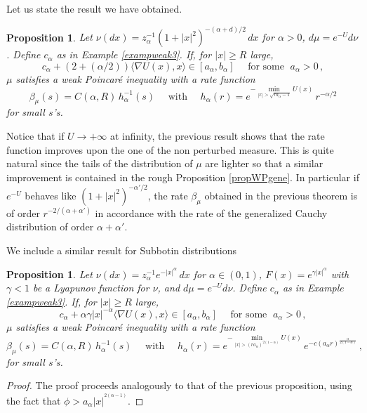\documentclass[11pt,reqno]{amsart}
\numberwithin{equation}{section}
\newtheorem{proposition}[theorem]{Proposition}
\theoremstyle{definition}
\theoremstyle{remark}
\begin{document}
Let us state the result we have obtained.
\begin{proposition}\label{propperturbcauchy}
Let $\nu(dx)= z_\alpha^{-1} (1+|x|^2)^{- (\alpha+d)/2} \, dx$ for $\alpha>0$, $d\mu=e^{-U}d\nu$. Define $c_\alpha$ as in Example \ref{exampweak3}. If, for $|x| \geq R$ large, $$c_\alpha + (2+(\alpha/2)) \langle \nabla U(x), x\rangle \in [a_\alpha,b_\alpha] \quad \textrm{ for some } \; a_\alpha >0 \, ,$$ $\mu$ satisfies a weak Poincar\'e inequality with a rate function 
$$\beta_\mu(s) = C(\alpha,R) \, h_\alpha^{-1}(s) \quad \textrm{ with } \quad {h_\alpha(r)= e^{- \min_{|x|>\sqrt{ra_\alpha-1}} U(x)} \, r^{-\alpha/2} }$$ 
for small $s$'s.
\end{proposition}
Notice that if $U \to + \infty$ at infinity, the previous result shows that the rate function improves upon the one of the non perturbed measure. This is quite natural since the tails of the distribution of $\mu$ are lighter so that a similar improvement is contained in the rough Proposition \ref{propWPgene}. In particular if $e^{-U}$ behaves like $(1+|x|^2)^{-\alpha'/2}$, the rate $\beta_\mu$ obtained in the previous theorem is of order $r^{- 2/(\alpha+\alpha')}$ in accordance with the rate of the generalized Cauchy distribution of order $\alpha+\alpha'$.


We include a similar result for Subbotin distributions
\begin{proposition}\label{propperturbsubbotin}
Let $\nu(dx)= z_\alpha^{-1} e^{-\vert x\vert^\alpha} \, dx$ for $\alpha\in(0,1)$, $F(x)=e^{\gamma |x|^\alpha}$ with  $\gamma <1$ be a Lyapunov function for $\nu$, and $d\mu=e^{-U}d\nu$. Define $c_\alpha$ as in Example \ref{exampweak3}. If, for $|x| \geq R$ large, $$c_\alpha + \alpha \gamma\vert x \vert^{-\alpha} \langle \nabla U(x), x\rangle \in [a_\alpha,b_\alpha] \quad \textrm{ for some } \; a_\alpha >0 \, ,$$ $\mu$ satisfies a weak Poincar\'e inequality with a rate function $$\beta_\mu(s) = C(\alpha,R) \, h_\alpha^{-1}(s) \quad \textrm{ with } \quad h_\alpha(r)= e^{- \min_{|x|>{(ra_\alpha)^{2(1-\alpha)}}} U(x)} \, e^{-c(a_\alpha r)^{\frac{\alpha}{2(1-\alpha)}}} \, ,$$ for small $s$'s.
\end{proposition}
\begin{proof}
    The proof proceeds analogously to that of the previous proposition, using the fact that $\phi>a_\alpha \vert x\vert^{^{2(\alpha -1)}}$.
\end{proof}
\end{document}
